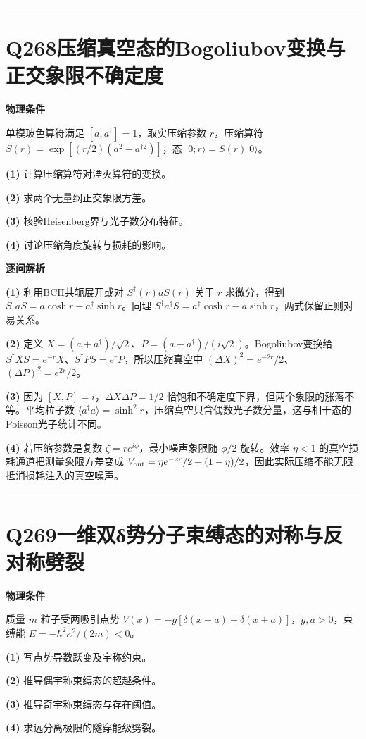 \documentclass[UTF8,a4paper,11pt,oneside,openany]{ctexbook}
\begin{document}
\par\bigskip\hrule\bigskip
\section*{Q268\quad 压缩真空态的Bogoliubov变换与正交象限不确定度}
\textbf{物理条件}\par 单模玻色算符满足 \([a,a^\dagger]=1\)，取实压缩参数 \(r\)，压缩算符 \(S(r)=\exp[(r/2)(a^2-a^{\dagger2})]\)，态 \(|0;r\rangle=S(r)|0\rangle\)。
\par\noindent\textbf{(1)} 计算压缩算符对湮灭算符的变换。
\par\noindent\textbf{(2)} 求两个无量纲正交象限方差。
\par\noindent\textbf{(3)} 核验Heisenberg界与光子数分布特征。
\par\noindent\textbf{(4)} 讨论压缩角度旋转与损耗的影响。

\par\medskip\noindent\textbf{逐问解析}
\par\noindent\textbf{(1)} 利用BCH共轭展开或对 \(S^\dagger(r)aS(r)\) 关于 \(r\) 求微分，得到 \(S^\dagger aS=a\cosh r-a^\dagger\sinh r\)。同理 \(S^\dagger a^\dagger S=a^\dagger\cosh r-a\sinh r\)，两式保留正则对易关系。
\par\noindent\textbf{(2)} 定义 \(X=(a+a^\dagger)/\sqrt2\)、\(P=(a-a^\dagger)/(i\sqrt2)\)。Bogoliubov变换给 \(S^\dagger XS=e^{-r}X\)、\(S^\dagger PS=e^{r}P\)，所以压缩真空中 \((\Delta X)^2=e^{-2r}/2\)、\((\Delta P)^2=e^{2r}/2\)。
\par\noindent\textbf{(3)} 因为 \([X,P]=i\)，\(\Delta X\Delta P=1/2\) 恰饱和不确定度下界，但两个象限的涨落不等。平均粒子数 \(\langle a^\dagger a\rangle=\sinh^2r\)，压缩真空只含偶数光子数分量，这与相干态的Poisson光子统计不同。
\par\noindent\textbf{(4)} 若压缩参数是复数 \(\zeta=re^{i\phi}\)，最小噪声象限随 \(\phi/2\) 旋转。效率 \(\eta<1\) 的真空损耗通道把测量象限方差变成 \(V_{\rm out}=\eta e^{-2r}/2+(1-\eta)/2\)，因此实际压缩不能无限抵消损耗注入的真空噪声。

\par\bigskip\hrule\bigskip
\section*{Q269\quad 一维双δ势分子束缚态的对称与反对称劈裂}
\textbf{物理条件}\par 质量 \(m\) 粒子受两吸引点势 \(V(x)=-g[\delta(x-a)+\delta(x+a)]\)，\(g,a>0\)，束缚能 \(E=-\hbar^2\kappa^2/(2m)<0\)。
\par\noindent\textbf{(1)} 写点势导数跃变及宇称约束。
\par\noindent\textbf{(2)} 推导偶宇称束缚态的超越条件。
\par\noindent\textbf{(3)} 推导奇宇称束缚态与存在阈值。
\par\noindent\textbf{(4)} 求远分离极限的隧穿能级劈裂。
\end{document}
